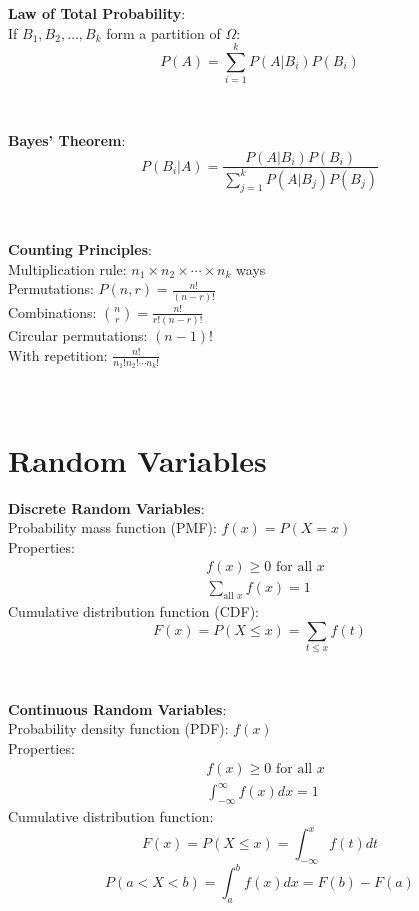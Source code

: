 \documentclass{article}
\newenvironment{cheatformula}[1][Title]{
    \begin{minipage}{\linewidth}
    \textbf{#1}:\\
}{
    \end{minipage}\\[2ex]
}
\begin{document}
\begin{multicols*}{2}
\begin{cheatformula}[Law of Total Probability]
    If $B_1, B_2, \ldots, B_k$ form a partition of $\Omega$:
    $$P(A) = \sum_{i=1}^{k} P(A|B_i)P(B_i)$$
\end{cheatformula}

\begin{cheatformula}[Bayes' Theorem]
    $$P(B_i|A) = \frac{P(A|B_i)P(B_i)}{\sum_{j=1}^{k} P(A|B_j)P(B_j)}$$
\end{cheatformula}

\begin{cheatformula}[Counting Principles]
    Multiplication rule: $n_1 \times n_2 \times \cdots \times n_k$ ways\\
    Permutations: $P(n,r) = \frac{n!}{(n-r)!}$\\
    Combinations: $\binom{n}{r} = \frac{n!}{r!(n-r)!}$\\
    Circular permutations: $(n-1)!$\\
    With repetition: $\frac{n!}{n_1!n_2!\cdots n_k!}$
\end{cheatformula}

\section{Random Variables}

\begin{cheatformula}[Discrete Random Variables]
    Probability mass function (PMF): $f(x) = P(X = x)$\\
    Properties:
    \begin{align*}
        &f(x) \geq 0 \text{ for all } x\\
        &\sum_{\text{all } x} f(x) = 1
    \end{align*}
    Cumulative distribution function (CDF):
    $$F(x) = P(X \leq x) = \sum_{t \leq x} f(t)$$
\end{cheatformula}

\begin{cheatformula}[Continuous Random Variables]
    Probability density function (PDF): $f(x)$\\
    Properties:
    \begin{align*}
        &f(x) \geq 0 \text{ for all } x\\
        &\int_{-\infty}^{\infty} f(x)dx = 1
    \end{align*}
    Cumulative distribution function:
    $$F(x) = P(X \leq x) = \int_{-\infty}^{x} f(t)dt$$
    $$P(a < X < b) = \int_a^b f(x)dx = F(b) - F(a)$$
\end{cheatformula}


\end{multicols*}
\end{document}
